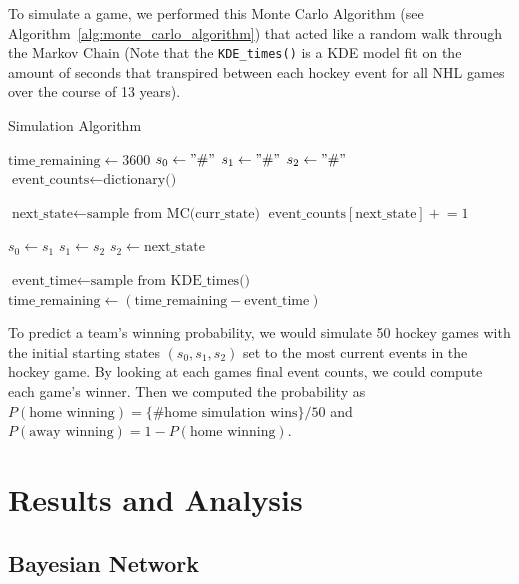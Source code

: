 \documentclass[11pt]{article}
\begin{document}
To simulate a game, we performed this Monte Carlo Algorithm (see Algorithm~\ref{alg:monte_carlo_algorithm}) that acted like a random walk through the Markov Chain (Note that the {\tt KDE\_times()} is a KDE model fit on the amount of seconds that transpired between 
each hockey event for all NHL games over the course of 13 years).
\begin{algorithm}
    \caption{Simulation Algorithm}
    \begin{algorithmic}[1]
        \State $\text{time\_remaining} \gets 3600$
        \State $s_0 \gets "\#"$
        \State $s_1 \gets "\#"$
        \State $s_2 \gets "\#"$
        \State $\text{event\_counts} \gets \text{dictionary()}$

            \State $\text{next\_state} \gets \text{sample from } \text{MC(curr\_state)}$
            \State $\text{event\_counts}[\text{next\_state}] \mathrel{+}= 1$
            
            \State $s_0 \gets s_1$
            \State $s_1 \gets s_2$
            \State $s_2 \gets \text{next\_state}$

            \State $\text{event\_time} \gets \text{sample from } \text{KDE\_times()}$
            \State $\text{time\_remaining} \gets (\text{time\_remaining} - \text{event\_time})$
        \EndWhile
    \end{algorithmic}
    \label{alg:monte_carlo_algorithm}
\end{algorithm}

To predict a team's winning probability, we would simulate 50 hockey games with the initial starting states $(s_0, s_1, s_2)$ set to the most current events in the hockey game. By looking at each games
final event counts, we could compute each game's winner. Then we computed the 
probability as $P(\text{home winning}) = \{\text{\# home simulation wins}\}/50$ and 
$P(\text{away winning}) = 1-P(\text{home winning})$.

\section{Results and Analysis}

\subsection{Bayesian Network}
\end{document}
